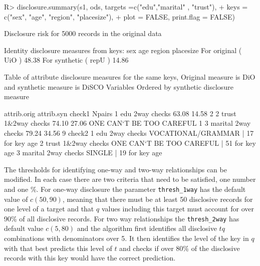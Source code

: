\documentclass[12pt]{article}
\renewcommand{\baselinestretch}{1.5} %
\begin{document}
\renewcommand{\baselinestretch}{1.0}
\begin{Schunk}
\begin{Sinput}
R> disclosure.summary(s1, ods,  targets =c("edu","marital" , "trust"),
+                    keys = c("sex", "age", "region", "placesize"), 
+                    plot = FALSE, print.flag = FALSE)
\end{Sinput}
\begin{Soutput}
Disclosure risk for 5000 records in the original data

Identity disclosure measures
from keys: sex age region placesize 
For original  ( UiO )  48.38 %
For synthetic ( repU ) 14.86 %

Table of attribute disclosure measures for the same keys, 
Original measure is  DiO and synthetic measure is DiSCO 
Variables Ordered by synthetic disclosure measure

                      attrib.orig attrib.syn                   check1 Npairs
1 edu 2way checks           63.08      14.58                               2
2 trust 1&2way checks       74.10      27.06 ONE CAN`T BE TOO CAREFUL      1
3 marital 2way checks       79.24      34.56                               9
                                                         check2
1 edu 2way checks           VOCATIONAL/GRAMMAR | 17 for key age
2 trust 1&2way checks ONE CAN`T BE TOO CAREFUL | 51 for key age
3 marital 2way checks                   SINGLE | 19 for key age
\end{Soutput}
\end{Schunk}
\renewcommand{\baselinestretch}{1.5}
The thresholds for identifying one-way and two-way relationships can be modified. In each case there are two criteria that need to be satisfied, one number and one \%. For one-way disclosure 
the parameter \texttt{thresh\_1way} has the default value of $c(50, 90)$, meaning that there must be at least 50 disclosive records for one level of a target and that $q$ values including this target must account for over 90\% of all disclosive records. For two way relationships the \texttt{thresh\_2way} has default value $c(5,80)$ and the  algorithm first identifies all 
disclosive $tq$ combinations  with denominators over 5. It then identifies the level of the key in $q$ with that best predicts this level of $t$ and checks if over 80\% of the disclosive  records with this key would have the correct prediction. 
\end{document}

